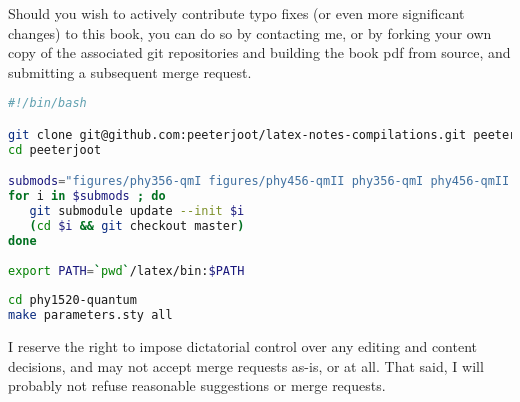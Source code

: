 %
%

Should you wish to actively contribute typo fixes (or even more significant changes) to this book, you can do so by contacting me, or by forking your own copy of the associated git repositories and building the book pdf from source, and submitting a subsequent merge request.

\begin{lstlisting}[language=bash]
#!/bin/bash

git clone git@github.com:peeterjoot/latex-notes-compilations.git peeterjoot
cd peeterjoot

submods="figures/phy356-qmI figures/phy456-qmII phy356-qmI phy456-qmII figures/phy1520-quantum phy1520-quantum julia mathematica latex"
for i in $submods ; do
   git submodule update --init $i
   (cd $i && git checkout master)
done
 
export PATH=`pwd`/latex/bin:$PATH
 
cd phy1520-quantum
make parameters.sty all
\end{lstlisting}

I reserve the right to impose dictatorial control over any editing and content decisions, and may not accept merge requests as-is, or at all. That said, I will probably not refuse reasonable suggestions or merge requests.

